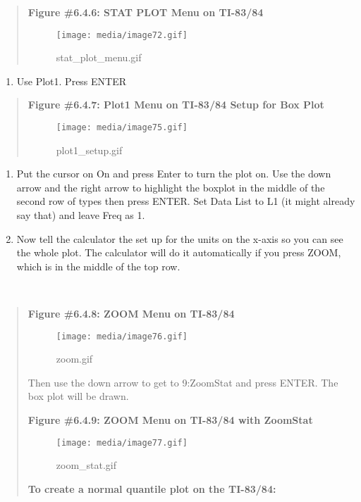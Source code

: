 \documentclass[]{book}
\providecommand{\tightlist}{%
  \setlength{\itemsep}{0pt}\setlength{\parskip}{0pt}}
\begin{document}
\begin{quote}
\textbf{Figure \#6.4.6: STAT PLOT Menu on TI-83/84}

\begin{figure}
\centering
\texttt{[image: media/image72.gif]}
\caption{stat\_plot\_menu.gif}
\end{figure}
\end{quote}

\begin{enumerate}
\def\labelenumi{\arabic{enumi}.}
\setcounter{enumi}{4}
\tightlist
\item
  Use Plot1. Press ENTER
\end{enumerate}

\begin{quote}
\textbf{Figure \#6.4.7: Plot1 Menu on TI-83/84 Setup for Box Plot}

\begin{figure}
\centering
\texttt{[image: media/image75.gif]}
\caption{plot1\_setup.gif}
\end{figure}
\end{quote}

\begin{enumerate}
\def\labelenumi{\arabic{enumi}.}
\setcounter{enumi}{5}
\item
  Put the cursor on On and press Enter to turn the plot on. Use the
  down arrow and the right arrow to highlight the boxplot in the
  middle of the second row of types then press ENTER. Set Data List to
  L1 (it might already say that) and leave Freq as 1.
\item
  Now tell the calculator the set up for the units on the x-axis so
  you can see the whole plot. The calculator will do it automatically
  if you press ZOOM, which is in the middle of the top row.
\end{enumerate}

\textbf{\\
}

\begin{quote}
\textbf{Figure \#6.4.8: ZOOM Menu on TI-83/84}

\begin{figure}
\centering
\texttt{[image: media/image76.gif]}
\caption{zoom.gif}
\end{figure}

Then use the down arrow to get to 9:ZoomStat and press ENTER. The box
plot will be drawn.

\textbf{Figure \#6.4.9: ZOOM Menu on TI-83/84 with ZoomStat}

\begin{figure}
\centering
\texttt{[image: media/image77.gif]}
\caption{zoom\_stat.gif}
\end{figure}

\textbf{To create a normal quantile plot on the TI-83/84:}
\end{quote}
\end{document}
